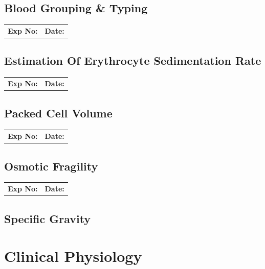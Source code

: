\documentclass[a4paper,12pt]{book}
\begin{document}
\chapter*{\centering Blood Grouping \& Typing}
		\begin{tabular}{p{5in} p{1in}}
			\textbf{Exp No:}  & \textbf{Date:}\\
		\end{tabular}

\chapter*{\centering Estimation Of Erythrocyte Sedimentation Rate}
		\begin{tabular}{p{5in} p{1in}}
			\textbf{Exp No:}  & \textbf{Date:}\\
		\end{tabular}

\chapter*{\centering Packed Cell Volume}
		\begin{tabular}{p{5in} p{1in}}
			\textbf{Exp No:}  & \textbf{Date:}\\
		\end{tabular}

\chapter*{\centering Osmotic Fragility}
		\begin{tabular}{p{5in} p{1in}}
			\textbf{Exp No:}  & \textbf{Date:}\\
		\end{tabular}

\chapter*{\centering Specific Gravity}

\part{Clinical Physiology}
\end{document}
